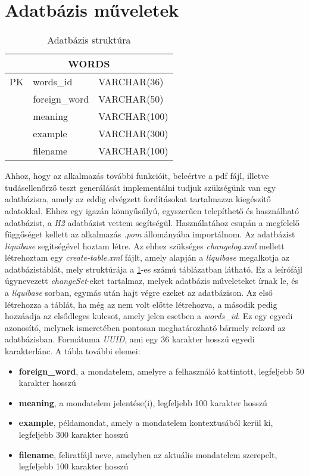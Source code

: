 \section{Adatbázis műveletek}

\begin{table}[h!]
\centering
\begin{tabular}{ |p{1cm}|p{3cm}p{3cm}|  }
\hline
\multicolumn{3}{|c|}{WORDS} \\
\hline
 PK & words\_id & VARCHAR(36) \\
 \hline
  & foreign\_word & VARCHAR(50) \\
  & meaning & VARCHAR(100) \\
  & example & VARCHAR(300) \\
  & filename & VARCHAR(100) \\
\hline
\end{tabular}
\caption{Adatbázis struktúra}
\label{table:adatbazis}
\end{table}

Ahhoz, hogy az alkalmazás további funkcióit, beleértve a pdf fájl, illetve tudásellenőrző teszt generálását implementálni tudjuk szükségünk van egy adatbázisra, amely az eddig elvégzett fordításokat tartalmazza kiegészítő adatokkal. Ehhez egy igazán könnyűsúlyú, egyszerűen telepíthető és használható adatbázist, a \textit{H2} adatbázist vettem segítségül. Használatához csupán a megfelelő függőséget kellett az alkalmazás \textit{.pom} állományába importálnom. Az adatbázist \textit{liquibase} segítségével hoztam létre. Az ehhez szükséges \textit{changelog.xml} mellett létrehoztam egy \textit{create-table.xml} fájlt, amely alapján a \textit{liquibase} megalkotja az adatbázistáblát, mely struktúrája a \ref{table:adatbazis}-es számú táblázatban látható. Ez a leírófájl 
úgynevezett \textit{changeSet}-eket tartalmaz, melyek adatbázis műveleteket írnak le, és a \textit{liquibase} sorban, egymás után hajt végre ezeket az adatbázison. Az első létrehozza a táblát, ha még az nem volt előtte létrehozva, a második pedig hozzáadja az elsődleges kulcsot, amely jelen esetben a \textit{words\_id}. Ez egy egyedi azonosító, melynek ismeretében pontosan meghatározható bármely rekord az adatbázisban. Formátuma \textit{UUID}, ami egy 36 karakter hosszú egyedi karakterlánc. A tábla további elemei:
\begin{itemize}
\item \textbf{ foreign\_word}, a mondatelem, amelyre a felhasználó kattintott, legfeljebb 50 karakter hosszú
\item \textbf{meaning}, a mondatelem jelentése(i), legfeljebb 100 karakter hosszú
\item \textbf{example}, példamondat, amely a mondatelem kontextusából kerül ki, legfeljebb 300 karakter hosszú
\item \textbf{filename}, feliratfájl neve, amelyben az aktuális mondatelem szerepelt, legfeljebb 100 karakter hosszú
\end{itemize}

